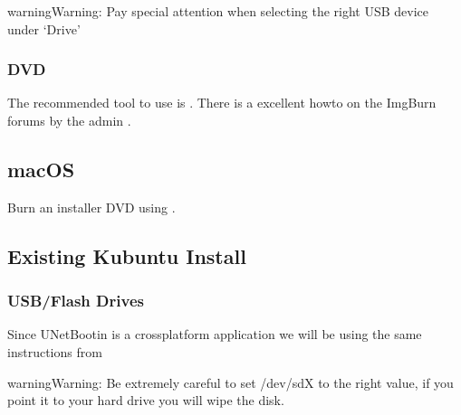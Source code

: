 \documentclass[letterpaper,10pt,english]{sphinxmanual}
\begin{document}

\begin{sphinxadmonition}{warning}{Warning:}
\sphinxAtStartPar
Pay special attention when selecting the right USB device under ‘Drive’
\end{sphinxadmonition}


\subsubsection{DVD}
\label{\detokenize{docs/installation:dvd}}
\sphinxAtStartPar
The recommended tool to use is . There is a excellent how\sphinxhyphen{}to on the ImgBurn forums by the admin .


\subsection{macOS}
\label{\detokenize{docs/installation:macos}}\label{\detokenize{docs/installation:kubuntu-install-link}}
\sphinxAtStartPar
Burn an installer DVD using .


\subsection{Existing Kubuntu Install}
\label{\detokenize{docs/installation:existing-kubuntu-install}}

\subsubsection{USB/Flash Drives}
\label{\detokenize{docs/installation:id1}}
\sphinxAtStartPar
Since UNetBootin is a cross\sphinxhyphen{}platform application we will be using the same instructions from {\hyperref[\detokenize{docs/installation:usb-drives-link}]{}}

\begin{sphinxadmonition}{warning}{Warning:}
\sphinxAtStartPar
Be extremely careful to set /dev/sdX to the right value, if you point it to your hard drive you will wipe the disk.
\end{sphinxadmonition}
\end{document}
